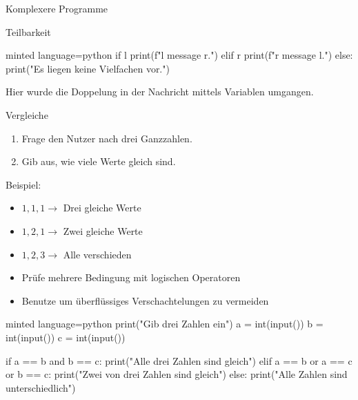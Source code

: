 \begin{task}{Komplexere Programme}
\begin{subtask*}{Teilbarkeit}
\begin{solution}
\begin{codeBlock}[]{minted language=python}
                if l %
                    print(f"{l} {message} {r}.")
                elif r %
                    print(f"{r} {message} {l}.")
                else:
                    print("Es liegen keine Vielfachen vor.")
            \end{codeBlock}
            Hier wurde die Doppelung in der Nachricht
            mittels Variablen umgangen.
        \end{solution}
    \end{subtask*}

    \begin{subtask*}{Vergleiche}
        \begin{enumerate}
            \item Frage den Nutzer nach drei Ganzzahlen.
            \item Gib aus, wie viele Werte gleich sind.
        \end{enumerate}

        Beispiel:
        \begin{itemize}
            \item $1, 1, 1 \to$ Drei gleiche Werte
            \item $1, 2, 1 \to$ Zwei gleiche Werte
            \item $1, 2, 3 \to$ Alle verschieden
        \end{itemize}

        \begin{hinweise}
            \begin{itemize}
                \item Prüfe mehrere Bedingung mit logischen Operatoren
                \item Benutze  um überflüssiges
                    Verschachtelungen zu vermeiden
            \end{itemize}
        \end{hinweise}

        \begin{solution}
            \begin{codeBlock}[]{minted language=python}
                print("Gib drei Zahlen ein")
                a = int(input())
                b = int(input())
                c = int(input())

                if a == b and b == c:
                    print("Alle drei Zahlen sind gleich")
                elif a == b or a == c or b == c:
                    print("Zwei von drei Zahlen sind gleich")
                else:
                    print("Alle Zahlen sind unterschiedlich")
            \end{codeBlock}
        \end{solution}
    \end{subtask*}
\end{task}


